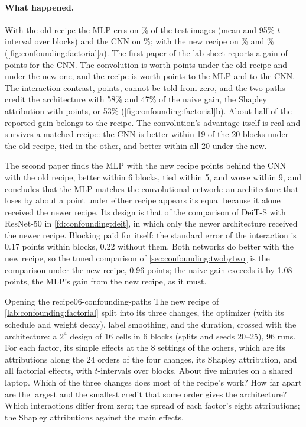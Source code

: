\begin{refsection}
\paragraph{What happened.} With the old recipe the MLP errs on \% of the test images (mean and 95\% $t$-interval over blocks) and the CNN on \%; with the new recipe on \% and \% (\cref{fig:confounding:factorial}a). The first paper of the lab sheet reports a gain of  points for the CNN. The convolution is worth  points under the old recipe and  under the new one, and the recipe is worth  points to the MLP and  to the CNN. The interaction contrast,  points, cannot be told from zero, and the two paths credit the architecture with 58\% and 47\% of the naive gain, the Shapley attribution with  points, or 53\% (\cref{fig:confounding:factorial}b). About half of the reported gain belongs to the recipe. The convolution's advantage itself is real and survives a matched recipe: the CNN is better within 19 of the 20 blocks under the old recipe, tied in the other, and better within all 20 under the new.

The second paper finds the MLP with the new recipe  points behind the CNN with the old recipe, better within 6 blocks, tied within 5, and worse within 9, and concludes that the MLP matches the convolutional network: an architecture that loses by about a point under either recipe appears its equal because it alone received the newer recipe. Its design is that of the comparison of DeiT-S with ResNet-50 in \cref{fd:confounding:deit}, in which only the newer architecture received the newer recipe. Blocking paid for itself: the standard error of the interaction is 0.17 points within blocks, 0.22 without them. Both networks do better with the new recipe, so the tuned comparison of \cref{sec:confounding:twobytwo} is the comparison under the new recipe, 0.96 points; the naive gain exceeds it by 1.08 points, the MLP's gain from the new recipe, as it must.

\begin{lab}{Opening the recipe}{06-confounding-paths}\label{lab:confounding:paths}
 The new recipe of \cref{lab:confounding:factorial} split into its three changes, the optimizer (with its schedule and weight decay), label smoothing, and the duration, crossed with the architecture: a $2^4$ design of 16 cells in 6 blocks (splits and seeds 20--25), 96 runs. For each factor, its simple effects at the 8 settings of the others, which are its attributions along the 24 orders of the four changes, its Shapley attribution, and all factorial effects, with $t$-intervals over blocks. About five minutes on a shared laptop.
 Which of the three changes does most of the recipe's work? How far apart are the largest and the smallest credit that some order gives the architecture?
 Which interactions differ from zero; the spread of each factor's eight attributions; the Shapley attributions against the main effects.
\end{lab}


\end{refsection}
